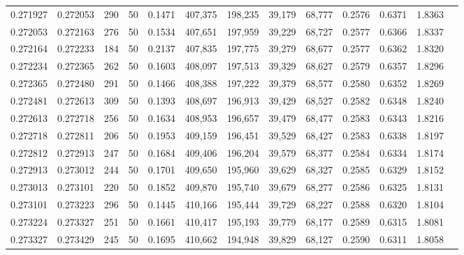 \begin{tabular}{rrrrrrrrrrrrr}
0.271927 & 0.272053 &   290 &  50 &                                     0.1471 & 407,375 & 198,235 &  39,179 &  68,777 & 0.2576 & 0.6371 & 1.8363 \\
0.272053 & 0.272163 &   276 &  50 &                                     0.1534 & 407,651 & 197,959 &  39,229 &  68,727 & 0.2577 & 0.6366 & 1.8337 \\
0.272164 & 0.272233 &   184 &  50 &                                     0.2137 & 407,835 & 197,775 &  39,279 &  68,677 & 0.2577 & 0.6362 & 1.8320 \\
0.272234 & 0.272365 &   262 &  50 &                                     0.1603 & 408,097 & 197,513 &  39,329 &  68,627 & 0.2579 & 0.6357 & 1.8296 \\
0.272365 & 0.272480 &   291 &  50 &                                     0.1466 & 408,388 & 197,222 &  39,379 &  68,577 & 0.2580 & 0.6352 & 1.8269 \\
0.272481 & 0.272613 &   309 &  50 &                                     0.1393 & 408,697 & 196,913 &  39,429 &  68,527 & 0.2582 & 0.6348 & 1.8240 \\
0.272613 & 0.272718 &   256 &  50 &                                     0.1634 & 408,953 & 196,657 &  39,479 &  68,477 & 0.2583 & 0.6343 & 1.8216 \\
0.272718 & 0.272811 &   206 &  50 &                                     0.1953 & 409,159 & 196,451 &  39,529 &  68,427 & 0.2583 & 0.6338 & 1.8197 \\
0.272812 & 0.272913 &   247 &  50 &                                     0.1684 & 409,406 & 196,204 &  39,579 &  68,377 & 0.2584 & 0.6334 & 1.8174 \\
0.272913 & 0.273012 &   244 &  50 &                                     0.1701 & 409,650 & 195,960 &  39,629 &  68,327 & 0.2585 & 0.6329 & 1.8152 \\
0.273013 & 0.273101 &   220 &  50 &                                     0.1852 & 409,870 & 195,740 &  39,679 &  68,277 & 0.2586 & 0.6325 & 1.8131 \\
0.273101 & 0.273223 &   296 &  50 &                                     0.1445 & 410,166 & 195,444 &  39,729 &  68,227 & 0.2588 & 0.6320 & 1.8104 \\
0.273224 & 0.273327 &   251 &  50 &                                     0.1661 & 410,417 & 195,193 &  39,779 &  68,177 & 0.2589 & 0.6315 & 1.8081 \\
0.273327 & 0.273429 &   245 &  50 &                                     0.1695 & 410,662 & 194,948 &  39,829 &  68,127 & 0.2590 & 0.6311 & 1.8058 \\

\end{tabular}
